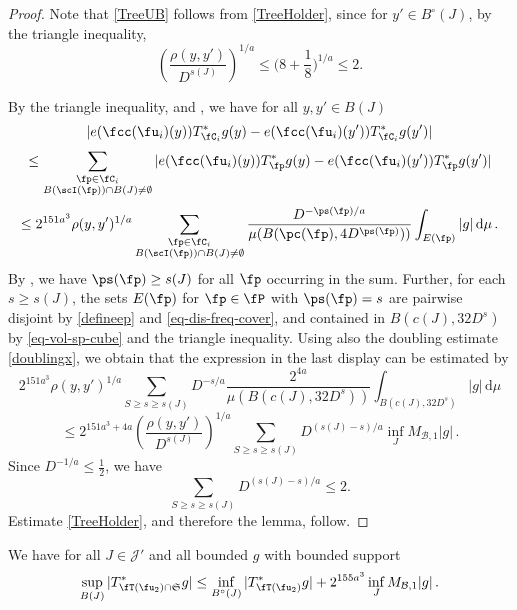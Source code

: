    \begin{proof}
        \leanok
        Note that \eqref{TreeUB} follows from \eqref{TreeHolder}, since for $y'\in B^\circ{}(J)$, by the triangle inequality,
        $$\left(\frac{\rho(y,y')}{D^{s(J)}}\right)^{1/a}\le \Big(8 + \frac{1}8\Big)^{1/a}\le 2.$$

        By the triangle inequality,  and , we have for all $y, y' \in B(J)$
        \begin{equation}
            \label{eq-C-Lip}
            |e(\fcc(\fu_i)(y)) T_{\fC_i}^* g(y) - e(\fcc(\fu_i)(y')) T_{\fC_i}^* g(y')|
        \end{equation}
        $$
            \leq \sum_{\substack{\fp \in \fC_i\\ B(\scI(\fp)) \cap B(J) \neq \emptyset}} |e(\fcc(\fu_i)(y)) T_{\fp}^* g(y) - e(\fcc(\fu_i)(y')) T_{\fp}^* g(y')|
        $$
        $$
            \le 2^{151a^3}\rho(y,y')^{1/a} \sum_{\substack{\fp \in \fC_i\\ B(\scI(\fp)) \cap B(J) \neq \emptyset}} \frac{D^{- \ps(\fp)/a}}{\mu(B(\pc(\fp), 4D^{\ps(\fp)}))} \int_{E(\fp)} |g| \, \mathrm{d}\mu\,.
        $$
        By , we have $\ps(\fp) \ge s(J)$ for all $\fp$ occurring in the sum. Further, for each $s \ge s(J)$, the sets $E(\fp)$ for $\fp \in \fP$ with $\ps(\fp) = s$ are pairwise disjoint by \eqref{defineep} and \eqref{eq-dis-freq-cover}, and contained in $B(c(J), 32D^{s})$ by \eqref{eq-vol-sp-cube} and the triangle inequality. Using also the doubling estimate \eqref{doublingx}, we obtain that the expression in the last display can be estimated by
        $$
            2^{151a^3}\rho(y,y')^{1/a} \sum_{S \ge s \ge s(J)} D^{-s/a} \frac{2^{4a}}{\mu(B(c(J), 32D^{s}))} \int_{B(c(J), 32D^{s})} |g| \, \mathrm{d}\mu
        $$
        $$
            \le 2^{151a^3+4a} \left(\frac{\rho(y,y')}{D^{s(J)}}\right)^{1/a} \sum_{S \ge s \ge s(J)} D^{(s(J) - s)/a} \inf_J M_{\mathcal{B},1} |g|\,.
        $$
        Since $D^{-1/a}\le\frac12$, we have
        $$
            \sum_{S \ge s \ge s(J)} D^{(s(J) - s)/a} \le 2.
        $$
        Estimate \eqref{TreeHolder}, and therefore the lemma, follow.
    \end{proof}

    \begin{lemma}
        \label{global-tree-control-2}
        \leanok
        We have for all $J \in \mathcal{J}'$ and all bounded $g$ with bounded support
        $$
            \sup_{B(J)} |T^*_{\fT(\fu_2) \cap \mathfrak{S}} g| \le \inf_{B^\circ{}(J)} |T^*_{\fT(\fu_2)} g| + 2^{155a^3} \inf_{J} M_{\mathcal{B},1}|g|\,.
        $$
    \end{lemma}

